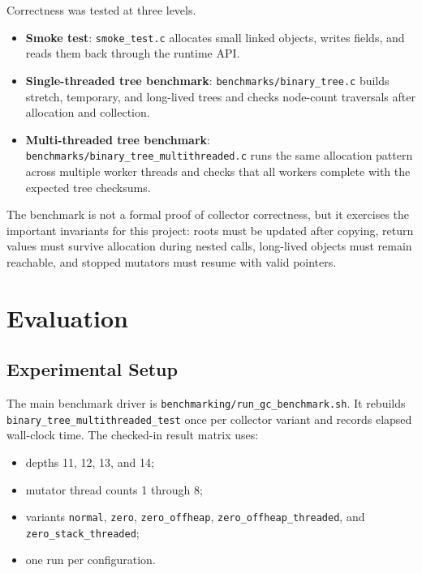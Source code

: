 \documentclass[11pt,a4paper]{article}
\begin{document}
Correctness was tested at three levels.

\begin{itemize}[leftmargin=*]
  \item \textbf{Smoke test}: \texttt{smoke\_test.c} allocates small linked
  objects, writes fields, and reads them back through the runtime API.
  \item \textbf{Single-threaded tree benchmark}: \texttt{benchmarks/binary\_tree.c}
  builds stretch, temporary, and long-lived trees and checks node-count
  traversals after allocation and collection.
  \item \textbf{Multi-threaded tree benchmark}:
  \texttt{benchmarks/binary\_tree\_multithreaded.c} runs the same allocation
  pattern across multiple worker threads and checks that all workers complete
  with the expected tree checksums.
\end{itemize}

The benchmark is not a formal proof of collector correctness, but it exercises
the important invariants for this project: roots must be updated after copying,
return values must survive allocation during nested calls, long-lived objects
must remain reachable, and stopped mutators must resume with valid pointers.

\section{Evaluation}
\label{sec:evaluation}

\subsection{Experimental Setup}

The main benchmark driver is
\texttt{benchmarking/run\_gc\_benchmark.sh}. It rebuilds
\texttt{binary\_tree\_multithreaded\_test} once per collector variant and records
elapsed wall-clock time. The checked-in result matrix uses:

\begin{itemize}[leftmargin=*]
  \item depths 11, 12, 13, and 14;
  \item mutator thread counts 1 through 8;
  \item variants \texttt{normal}, \texttt{zero}, \texttt{zero\_offheap},
  \texttt{zero\_offheap\_threaded}, and \texttt{zero\_stack\_threaded};
  \item one run per configuration.
\end{itemize}
\end{document}
